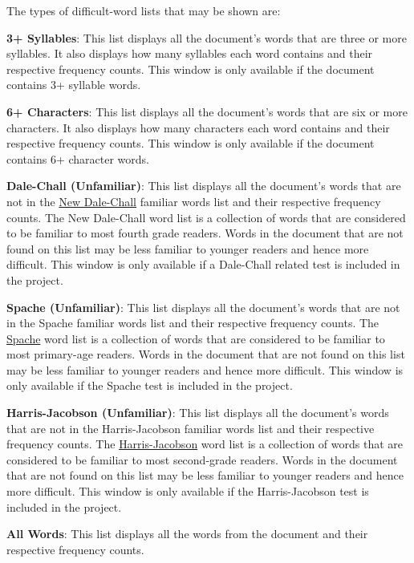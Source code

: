 \documentclass[
]{book}
\theoremstyle{definition}
\theoremstyle{definition}
\theoremstyle{definition}
\theoremstyle{definition}
\theoremstyle{remark}
\begin{document}
The types of difficult-word lists that may be shown are:

\textbf{3+ Syllables}: This list displays all the document's words that are three or more syllables. It also displays how many syllables each word contains and their respective frequency counts. This window is only available if the document contains 3+ syllable words.

\textbf{6+ Characters}: This list displays all the document's words that are six or more characters. It also displays how many characters each word contains and their respective frequency counts. This window is only available if the document contains 6+ character words.

\textbf{Dale-Chall (Unfamiliar)}: This list displays all the document's words that are not in the \protect\hyperlink{dale-chall-test}{New Dale-Chall} familiar words list and their respective frequency counts. The New Dale-Chall word list is a collection of words that are considered to be familiar to most fourth grade readers. Words in the document that are not found on this list may be less familiar to younger readers and hence more difficult. This window is only available if a Dale-Chall related test is included in the project.

\textbf{Spache (Unfamiliar)}: This list displays all the document's words that are not in the Spache familiar words list and their respective frequency counts. The \protect\hyperlink{spache-test}{Spache} word list is a collection of words that are considered to be familiar to most primary-age readers. Words in the document that are not found on this list may be less familiar to younger readers and hence more difficult. This window is only available if the Spache test is included in the project.

\textbf{Harris-Jacobson (Unfamiliar)}: This list displays all the document's words that are not in the Harris-Jacobson familiar words list and their respective frequency counts. The \protect\hyperlink{harris-jacobson}{Harris-Jacobson} word list is a collection of words that are considered to be familiar to most second-grade readers. Words in the document that are not found on this list may be less familiar to younger readers and hence more difficult. This window is only available if the Harris-Jacobson test is included in the project.

\textbf{All Words}: This list displays all the words from the document and their respective frequency counts.
\end{document}
